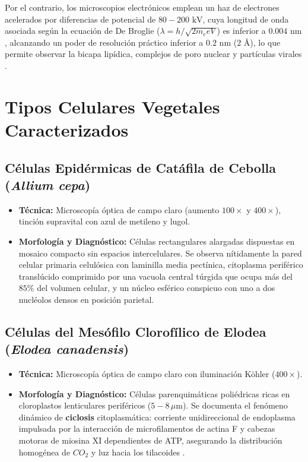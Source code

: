 \documentclass[spanish,letterpaper,oneside]{article}
\begin{document}
Por el contrario, los microscopios electrónicos emplean un haz de electrones acelerados por diferencias de potencial de $80-200\text{ kV}$, cuya longitud de onda asociada según la ecuación de De Broglie ($\lambda = h / \sqrt{2m_e e V}$) es inferior a $0.004\text{ nm}$, alcanzando un poder de resolución práctico inferior a $0.2\text{ nm}$ ($2\text{ Å}$), lo que permite observar la bicapa lipídica, complejos de poro nuclear y partículas virales \parencite{lodish2016}.

\section{Tipos Celulares Vegetales Caracterizados}
\subsection{Células Epidérmicas de Catáfila de Cebolla (\textit{Allium cepa})}
\begin{itemize}
    \item \textbf{Técnica:} Microscopía óptica de campo claro (aumento $100\times$ y $400\times$), tinción supravital con azul de metileno y lugol.
    \item \textbf{Morfología y Diagnóstico:} Células rectangulares alargadas dispuestas en mosaico compacto sin espacios intercelulares. Se observa nítidamente la pared celular primaria celulósica con laminilla media pectínica, citoplasma periférico translúcido comprimido por una vacuola central túrgida que ocupa más del $85\%$ del volumen celular, y un núcleo esférico conspicuo con uno a dos nucléolos densos en posición parietal.
\end{itemize}

\subsection{Células del Mesófilo Clorofílico de Elodea (\textit{Elodea canadensis})}
\begin{itemize}
    \item \textbf{Técnica:} Microscopía óptica de campo claro con iluminación Köhler ($400\times$).
    \item \textbf{Morfología y Diagnóstico:} Células parenquimáticas poliédricas ricas en cloroplastos lenticulares periféricos ($5-8\,\mu\text{m}$). Se documenta el fenómeno dinámico de \textbf{ciclosis} citoplasmática: corriente unidireccional de endoplasma impulsada por la interacción de microfilamentos de actina F y cabezas motoras de miosina XI dependientes de ATP, asegurando la distribución homogénea de $CO_2$ y luz hacia los tilacoides \parencite{taiz2015}.
\end{itemize}
\end{document}
